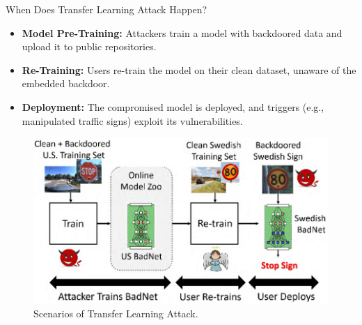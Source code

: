 \begin{frame}{When Does Transfer Learning Attack Happen?}
    \begin{itemize}
        \item \textbf{Model Pre-Training:} 
        Attackers train a model with backdoored data and upload it to public repositories.
        \item \textbf{Re-Training:} 
        Users re-train the model on their clean dataset, unaware of the embedded backdoor.
        \item \textbf{Deployment:} 
        The compromised model is deployed, and triggers (e.g., manipulated traffic signs) exploit its vulnerabilities.
    \end{itemize}
    \begin{figure}[h]
        \centering
        
        \begin{minipage}{0.4\textwidth} %
            \centering
            \includegraphics[width=\textwidth]{img/when-is.png} %
        \end{minipage}
        \begin{minipage}{0.35\textwidth} %
            \caption{Scenarios of Transfer Learning Attack.}
            \label{fig:transfer-attack}
        \end{minipage}%
    \end{figure}

\end{frame}

